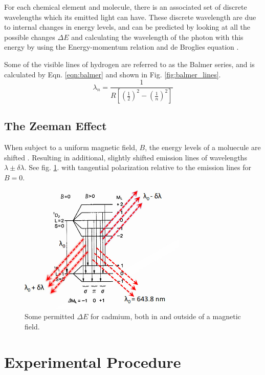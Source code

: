 \documentclass[11pt,a4paper]{article}
\begin{document}
      For each chemical element and molecule, there is an associated set of discrete wavelengths  which its emitted light can have. These discrete wavelength are due to internal changes in energy levels, and can be predicted by looking at all the possible changes $\Delta E$ and calculating the wavelength of the photon with this energy by using the Energy-momentum relation \cite{wiki:energy_momentum} and de Broglies equation \cite{wiki:debroglie}.

      Some of the visible lines of hydrogen are referred to as the Balmer series, and is calculated by Eqn. \ref{eqn:balmer} and shown in Fig. \ref{fig:balmer_lines}.
      \begin{equation}
         \lambda_n = \frac{1}{R \left[ \left(\frac{1}{2}\right)^2 - \left(\frac{1}{n}\right)^2 \right]} 
         \label{eqn:balmer}
      \end{equation}

    \subsection{The Zeeman Effect}
      When subject to a uniform magnetic field, $B$, the energy levels of a moluecule are shifted \cite{griffiths}. Resulting in additional, slightly shifted emission lines of wavelengths $\lambda \pm \delta \lambda$. See fig. \ref{fig:zeeman_energy}. with tangential polarization relative to the emission lines for $B=0$.

      \begin{figure}[H]
        \center 
        \includegraphics[width=8cm]{scripts/figs/ZEEMAN_ENERGYLEVELS.jpg}
        \caption{Some permitted $\Delta E$ for cadmium, both in and outside of a magnetic field.}
        \label{fig:zeeman_energy}
      \end{figure}


\section{\label{section:experimental}Experimental Procedure} 
\end{document}
